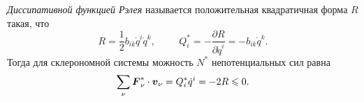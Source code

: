\begin{to_def} 
    \textit{Диссипативной функцией Рэлея} называется  положительная квадратичная форма $R$ такая, что
    \begin{equation*}
        R = \frac{1}{2} b_{ik} \dot{q}^i \dot{q}^k,
        \hspace{1cm}
        Q^*_i = - \frac{\partial R}{\partial \dot{q}^i}  = - b_{ik} \dot{q}^k.
    \end{equation*}
    Тогда для склерономной системы можность $N^*$ непотенциальных сил равна
    \begin{equation*}
        \sum_\nu \mbox{\boldmath $F$}_\nu^* \cdot \mbox{\boldmath $v$}_\nu = Q_i^* \dot{q}^i = - 2 R \leqslant 0.
    \end{equation*}
\end{to_def}





